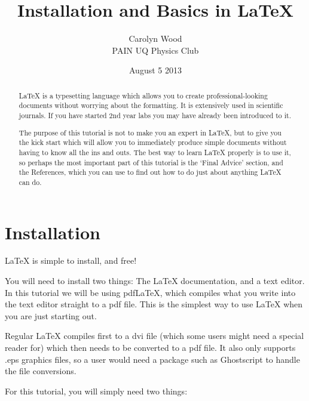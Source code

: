 \documentclass[a4paper]{article}
\begin{document}
\title{Installation and Basics in \LaTeX}
\author{Carolyn Wood\\
PAIN UQ Physics Club}
\date{August 5 2013}
\maketitle

\begin{abstract}

LaTeX is a typesetting language which allows you to create professional-looking documents without worrying about the formatting. It is extensively used in scientific journals. If you have started 2nd year labs you may have already been introduced to it.

The purpose of this tutorial is not to make you an expert in LaTeX, but to give you the kick start which will allow you to immediately produce simple documents without having to know all the ins and outs.
The best way to learn LaTeX properly is to use it, so perhaps the most important part of this tutorial is the `Final Advice' section, and the References, which you can use to find out how to do just about anything LaTeX can do.
\end{abstract}

\section{Installation}

LaTeX is simple to install, and free!

You will need to install two things: The LaTeX documentation, and a text editor.
In this tutorial we will be using pdfLaTeX, which compiles what you write into the text editor straight to a pdf file. This is the simplest way to use LaTeX when you are just starting out.

Regular LaTeX compiles first to a dvi file (which some users might need a special reader for) which then needs to be converted to a pdf file. It also only supports .eps graphics files, so a user would need a package such as Ghostscript to handle the file conversions. 

For this tutorial, you will simply need two things:
\end{document}
